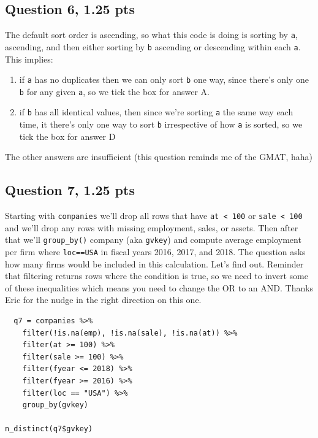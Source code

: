 \documentclass[11pt]{article}
\begin{document}
\subsection*{Question 6, 1.25 pts}
\label{sec:org3fe28db}
The default sort order is ascending, so what this code is doing is sorting by \texttt{a}, ascending, and then either sorting by \texttt{b} ascending or descending within each \texttt{a}.  This implies:

\begin{enumerate}
\item if \texttt{a} has no duplicates then we can only sort \texttt{b} one way, since there's only one \texttt{b} for any given \texttt{a}, so we tick the box for answer A.
\item if \texttt{b} has all identical values, then since we're sorting \texttt{a} the same way each time, it there's only one way to sort \texttt{b} irrespective of how \texttt{a} is sorted, so we tick the box for answer D
\end{enumerate}


The other answers are insufficient (this question reminds me of the GMAT, haha)

\newpage
\subsection*{Question 7, 1.25 pts}
\label{sec:orgabf58a8}
Starting with \texttt{companies} we'll drop all rows that have \texttt{at < 100} or \texttt{sale < 100} and we'll drop any rows with missing employment, sales, or assets.  Then after that we'll \texttt{group\_by()} company (aka \texttt{gvkey}) and compute average employment per firm where \texttt{loc==USA} in fiscal years 2016, 2017, and 2018.  The question asks how many firms would be included in this calculation.  Let's find out.  Reminder that filtering returns rows where the condition is true, so we need to invert some of these inequalities which means you need to change the OR to an AND.  Thanks Eric for the nudge in the right direction on this one.

\begin{verbatim}
  q7 = companies %>%
    filter(!is.na(emp), !is.na(sale), !is.na(at)) %>%
    filter(at >= 100) %>%
    filter(sale >= 100) %>%
    filter(fyear <= 2018) %>%
    filter(fyear >= 2016) %>%
    filter(loc == "USA") %>%
    group_by(gvkey)

n_distinct(q7$gvkey)
\end{verbatim}
\end{document}
